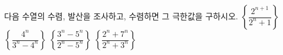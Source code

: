 다음 수열의 수렴, 발산을 조사하고, 수렴하면 그 극한값을 구하시오.
 $\left\{\dfrac{2^{n+1}}{2^n+1}\right\}$
 $\left\{\dfrac{4^n}{3^n-4^n}\right\}$
 $\left\{\dfrac{3^n-5^n}{2^n-5^n}\right\}$
 $\left\{\dfrac{2^n+7^n}{2^n+3^n}\right\}$
